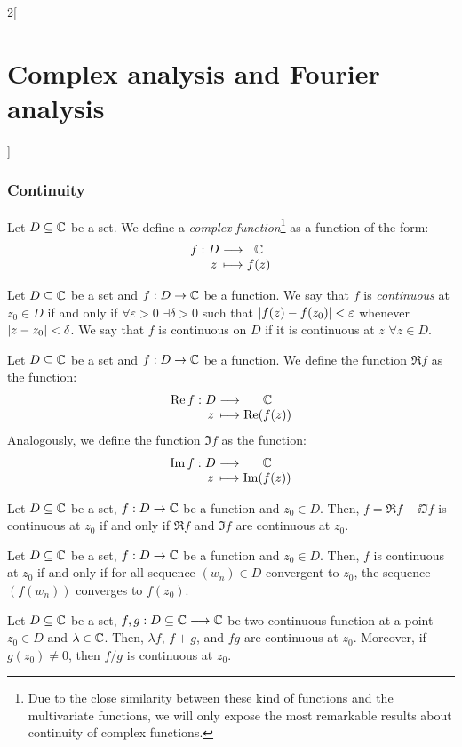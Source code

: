 \documentclass[../../../main.tex]{subfiles}
\begin{document}
\begin{multicols}{2}[\section{Complex analysis and Fourier analysis}]
  \subsubsection{Continuity}
  \begin{definition}
    Let $D \subseteq \mathbb{C}$ be a set. We define a \textit{complex function}\footnote{Due to the close similarity between these kind of functions and the multivariate functions, we will only expose the most remarkable results about continuity of complex functions.} as a function of the form:
    $$\function{f}{D}{\CC}{z}{f(z)}$$
  \end{definition}
  \begin{definition}
    Let $D \subseteq \mathbb{C}$ be a set and $f:D\rightarrow\mathbb{C}$ be a function. We say that $f$ is \emph{continuous} at $z_0\in D$ if and only if $\forall \varepsilon>0$ $\exists\delta>0$ such that $\abs{f(z)-f(z_0)}<\varepsilon$ whenever $\abs{z-z_0}<\delta$. We say that $f$ is continuous on $D$ if it is continuous at $z$ $\forall z\in D$.
  \end{definition}
  \begin{definition}
    Let $D \subseteq \mathbb{C}$ be a set and $f:D\rightarrow\mathbb{C}$ be a function. We define the function $\Re f$ as the function: $$\function{\Re f}{D}{\CC}{z}{\Re(f(z))}$$
    Analogously, we define the function $\Im f$ as the function: $$\function{\Im f}{D}{\CC}{z}{\Im(f(z))}$$
  \end{definition}
  \begin{proposition}
    Let $D \subseteq \mathbb{C}$ be a set, $f:D\rightarrow\mathbb{C}$ be a function and $z_0 \in D$. Then, $f = \Re f + \ii \Im f$ is continuous at $z_0$ if and only if $\Re f$ and $\Im f$ are continuous at $z_0$.
  \end{proposition}
  \begin{proposition}
    Let $D \subseteq \mathbb{C}$ be a set, $f:D\rightarrow\mathbb{C}$ be a function and $z_0 \in D$. Then, $f$ is continuous at $z_0$ if and only if for all sequence $(w_n)\in D$ convergent to $z_0$, the sequence $(f(w_n))$ converges to $f(z_0)$.
  \end{proposition}
  \begin{proposition}
    Let $D \subseteq \mathbb{C}$ be a set, $f,g:D \subseteq \mathbb{C} \longrightarrow \mathbb{C}$ be two continuous function at a point $z_0 \in D$ and $\lambda \in \mathbb{C}$. Then, $\lambda f$, $f+g$, and $fg$ are continuous at $z_0$. Moreover, if $g(z_0) \neq 0$, then $f/g$ is continuous at $z_0$.
  \end{proposition}

\end{multicols}
\end{document}
